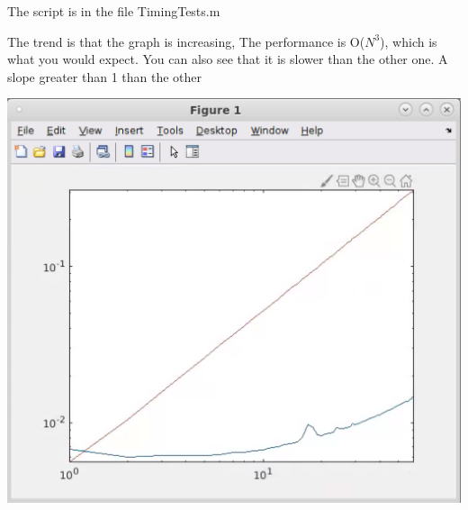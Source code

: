 \documentclass{report}
\begin{document}
\begin{flushleft}
The script is in the file TimingTests.m

The trend is that the graph is increasing, The performance is O($N^3$), which is what you would expect. You can also see that it is slower than the other one. A slope greater than 1 than the other
\end{flushleft}

\includegraphics [scale = .5] {TimeGraph}
\end{document}
